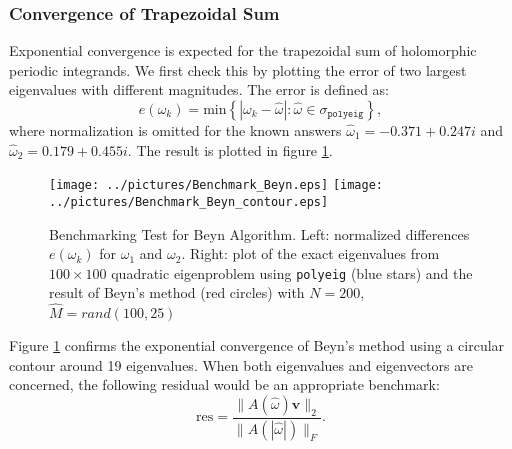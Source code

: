 \documentclass[11pt,letterpaper]{article}
\begin{document}
\subsubsection{Convergence of Trapezoidal Sum}
Exponential convergence is expected for the trapezoidal sum of holomorphic periodic integrands. We first check this by plotting the error of two largest eigenvalues with different magnitudes. The error is defined as: 
\begin{equation}
\label{eq:e}
e(\omega_k) = \mathrm{min}\left\lbrace  |\omega_k - \hat{\omega}|:\hat{\omega}\in\sigma_{\mathtt{polyeig}}\right\rbrace ,
\end{equation}
where normalization is omitted for the known answers  $\hat{\omega}_1 = -0.371 + 0.247i$ and $\hat{\omega}_2=
  0.179 + 0.455i$. The result is plotted in figure \ref{fig:Benchmark_Beyn}. 
\begin{figure}\label{fig:Benchmark_Beyn}
\begin{center}
\texttt{[image: ../pictures/Benchmark\_Beyn.eps]}
\texttt{[image: ../pictures/Benchmark\_Beyn\_contour.eps]}
\end{center}
\caption{Benchmarking Test for Beyn Algorithm. \textnormal{Left: normalized differences $e(\omega_k)$ for $\omega_1$ and $\omega_2$. Right: plot of the exact eigenvalues from $100\times100$ quadratic eigenproblem using {\tt polyeig} (blue stars) and the result of Beyn's method (red circles) with $N=200$, $\hat{M}=rand(100,25)$}}
\end{figure}
Figure \ref{fig:Benchmark_Beyn} confirms the exponential convergence of Beyn's method using a circular contour around 19 eigenvalues. When both eigenvalues and eigenvectors are concerned, the following residual would be an appropriate benchmark:
\begin{equation}
\label{eq:Residual}
\mathrm{res}=\frac{\| A(\hat{\omega})\mathbf{\hat{v}} \|_2 }{\|A(|\hat{\omega}|) \|_F}.
\end{equation}

\end{document}
